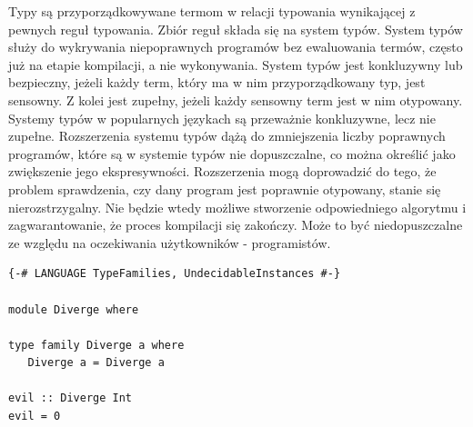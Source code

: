 {Typy są przyporządkowywane termom w relacji typowania wynikającej z pewnych
reguł typowania. Zbiór reguł składa się na system typów. System typów służy do
wykrywania niepoprawnych programów bez ewaluowania termów, często już na etapie
kompilacji, a nie wykonywania. System typów jest konkluzywny lub bezpieczny,
jeżeli każdy term, który ma w nim przyporządkowany typ, jest sensowny. Z kolei
jest zupełny, jeżeli każdy sensowny term jest w nim otypowany. Systemy typów w
popularnych językach są przeważnie konkluzywne, lecz nie zupełne.
Rozszerzenia
systemu typów dążą do zmniejszenia liczby poprawnych programów, które są w
systemie typów nie dopuszczalne, co można określić jako zwiększenie jego
ekspresywności. Rozszerzenia mogą doprowadzić do tego, że problem sprawdzenia,
czy dany program jest poprawnie otypowany, stanie się nierozstrzygalny. Nie
będzie wtedy możliwe stworzenie odpowiedniego algorytmu i zagwarantowanie, że
proces kompilacji się zakończy. Może to być niedopuszczalne ze względu na
oczekiwania użytkowników - programistów\cite{TAPL}.

\begin{lstlisting}[float,label={lst:types_diverge},
                   caption={Przykład programu, dla którego statyczne sprawdzanie typów w GHC się nie zakończy.}]
{-# LANGUAGE TypeFamilies, UndecidableInstances #-}

module Diverge where

type family Diverge a where
   Diverge a = Diverge a

evil :: Diverge Int
evil = 0
\end{lstlisting}


}
